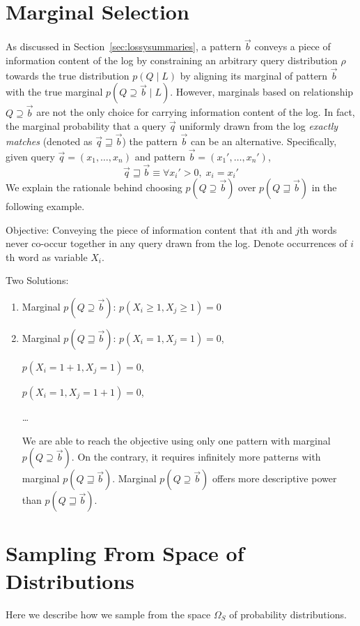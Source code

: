 \section{Marginal Selection}
\label{appendix:marginalselectionforpatternbasedsummary}
As discussed in Section~\ref{sec:lossysummaries}, a pattern $\vec b$ conveys a piece of information content of the log by constraining an arbitrary query distribution $\rho$ towards the true distribution $p(Q\;|\;L)$ by aligning its marginal of pattern $\vec b$ with the true marginal $p(Q\supseteq\vec{b}\;|\;L)$. 
However, marginals based on relationship $Q\supseteq\vec b$ are not the only choice for carrying information content of the log. 
In fact, the marginal probability that a query $\vec{q}$ uniformly drawn from the log \textit{exactly matches} (denoted as $\vec{q}\sqsupseteq\vec{b}$) the pattern $\vec{b}$ can be an alternative. Specifically, given query $\vec{q}=(x_1,\ldots,x_n)$ and pattern $\vec{b}=(x_1',\ldots,x_n')$, 
$$\vec{q}\sqsupseteq\vec{b}\equiv\forall x_i'>0,\;x_i=x_i'$$
We explain the rationale behind choosing $p(Q\supseteq\vec{b})$ over $p(Q\sqsupseteq\vec{b})$ in the following example.
\begin{example}
Objective: Conveying the piece of information content that $i$th and $j$th words never co-occur together in any query drawn from the log.
Denote occurrences of $i$th word as variable $X_i$.

Two Solutions: 
\begin{enumerate}
\item Marginal $p(Q\supseteq\vec{b})$: $p(X_i\geq 1,X_j\geq 1)=0$

\item Marginal $p(Q\sqsupseteq\vec{b})$:
$p(X_i=1,X_j=1)=0$,

$p(X_i=1+1,X_j=1)=0$,

$p(X_i=1,X_j=1+1)=0$,

\ldots

We are able to reach the objective using only one pattern with marginal $p(Q\supseteq\vec{b})$. 
On the contrary, it requires infinitely more patterns with marginal $p(Q\sqsupseteq\vec{b})$.
Marginal $p(Q\supseteq\vec{b})$ offers more descriptive power than $p(Q\sqsupseteq\vec{b})$.
\end{enumerate}
\end{example}

\section{Sampling From Space of Distributions}
\label{appendix:sampling}
Here we describe how we sample from the space $\Omega_S$ of probability distributions.
